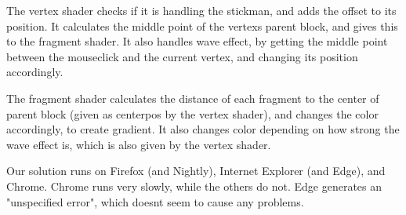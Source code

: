
The vertex shader checks if it is handling the stickman, and adds the offset to its position.
It calculates the middle point of the vertexs parent block, and gives this to the fragment shader.
It also handles wave effect, by getting the middle point between the mouseclick and the current vertex, and changing its position accordingly.



The fragment shader calculates the distance of each fragment to the center of parent block (given as centerpos by the vertex shader), and changes the color accordingly, to create gradient.
It also changes color depending on how strong the wave effect is, which is also given by the vertex shader.



Our solution runs on Firefox (and Nightly), Internet Explorer (and Edge), and Chrome.
Chrome runs very slowly, while the others do not. Edge generates an "unspecified error", which doesnt seem to cause any problems.
